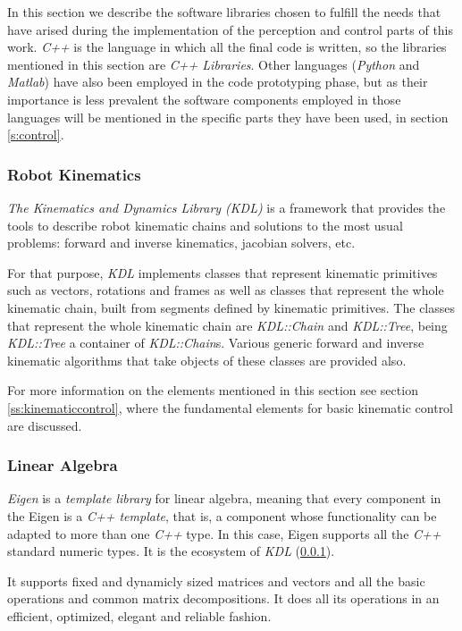 In this section we describe the software libraries chosen to fulfill the needs that have arised during the implementation of the perception and control parts of this work. \textit{C++} is the language in which all the final code is written, so the libraries mentioned in this section are \textit{C++ Libraries}. Other languages (\textit{Python} and \textit{Matlab}) have also been employed in the code prototyping phase, but as their importance is less prevalent the software components employed in those languages will be mentioned in the specific parts they have been used, in section \ref{s:control}.

\subsubsection{Robot Kinematics}
\label{sss:KDL}

\textit{The Kinematics and Dynamics Library (KDL)} \cite{KDL} is a framework that provides the tools to describe robot kinematic chains and solutions to the most usual problems: forward and inverse kinematics, jacobian solvers, etc.

For that purpose, \textit{KDL} implements classes that represent kinematic primitives such as vectors, rotations and frames as well as classes that represent the whole kinematic chain, built from segments defined by kinematic primitives. The classes that represent the whole kinematic chain are \textit{KDL::Chain} and \textit{KDL::Tree}, being \textit{KDL::Tree} a container of \textit{KDL::Chain}s. Various generic forward and inverse kinematic algorithms that take objects of these classes are provided also.

For more information on the elements mentioned in this section see section \ref{ss:kinematiccontrol}, where the fundamental elements for basic kinematic control are discussed.

\subsubsection{Linear Algebra}

\textit{Eigen} \cite{eigen} is a \textit{template library} for linear algebra, meaning that every component in the Eigen is a \textit{C++ template}, that is, a component whose functionality can be adapted to more than one \textit{C++} type. In this case, Eigen supports all the \textit{C++} standard numeric types. It is the ecosystem of \textit{KDL} (\ref{sss:KDL}).

It supports fixed and dynamicly sized matrices and vectors and all the basic operations and common matrix decompositions. It does all its operations in an efficient, optimized, elegant and reliable fashion.

